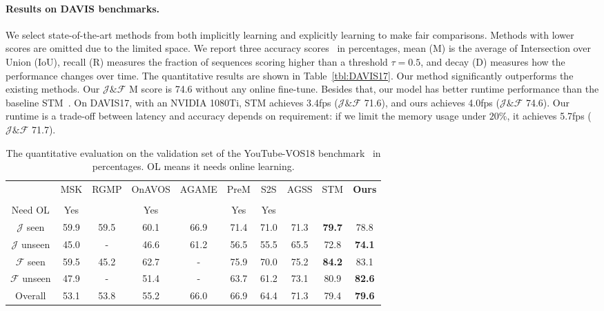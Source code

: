 \documentclass{article}
\begin{document}
\paragraph{Results on DAVIS benchmarks.}
We select state-of-the-art methods from both implicitly learning and explicitly learning to make fair comparisons.
Methods with lower scores are omitted due to the limited space.
We report three accuracy scores~\cite{pont-tuset_2017_2018} in percentages, mean (M) is the average of Intersection over Union (IoU), recall (R) measures the fraction of sequences scoring higher than a threshold $\tau=0.5$, and decay (D) measures how the performance changes over time.
The quantitative results are shown in Table~\ref{tbl:DAVIS17}.
Our method significantly outperforms the existing methods.
Our $\mathcal{J} \& \mathcal{F}$ M score is 74.6 without any online fine-tune.
Besides that, our model has better runtime performance than the baseline STM~\cite{oh_video_2019}.
On DAVIS17, with an NVIDIA 1080Ti, STM achieves 3.4fps ($\mathcal{J} \& \mathcal{F}$ 71.6), and ours achieves 4.0fps ($\mathcal{J} \& \mathcal{F}$ 74.6). 
Our runtime is a trade-off between latency and accuracy depends on requirement: if we limit the memory usage under $20\%$, it achieves 5.7fps ($\mathcal{J} \& \mathcal{F}$ 71.7).


\begin{table}
   \caption{The quantitative evaluation on the validation set of the YouTube-VOS18 benchmark~\cite{xu_youtube-vos_2018} in percentages. OL means it needs online learning.}
  \label{tbl:YV}
  \centering
  \begin{tabular}{c|ccccccccc}
        \toprule
         & MSK & RGMP & OnAVOS & AGAME & PreM & S2S & AGSS & STM & \textbf{Ours}\\
         & \cite{Perazzi2017} & \cite{oh_fast_2018} & \cite{voigtlaender17BMVC} & \cite{johnander2019generative} & \cite{luiten_premvos_2018} & \cite{xu2018youtube} & \cite{lin_agss-vos_2019} & \cite{oh_video_2019} & \\
         \midrule
         Need OL & Yes & & Yes &  & Yes & Yes & & &\\
         \midrule
        $\mathcal{J}$ seen   & 59.9 & 59.5 & 60.1 & 66.9 & 71.4 & 71.0 & 71.3 & \textbf{79.7} & 78.8 \\
        $\mathcal{J}$ unseen & 45.0 & -    & 46.6 & 61.2 & 56.5 & 55.5 & 65.5 & 72.8 & \textbf{74.1}\\
        \midrule
        $\mathcal{F}$ seen   & 59.5 & 45.2 & 62.7 & -    & 75.9 & 70.0 & 75.2 & \textbf{84.2} & 83.1\\
        $\mathcal{F}$ unseen & 47.9 & -    & 51.4 & -    & 63.7 & 61.2 & 73.1 & 80.9 & \textbf{82.6}\\
        \midrule
        Overall              & 53.1 & 53.8 & 55.2 & 66.0 & 66.9 & 64.4 & 71.3 & 79.4  & \textbf{79.6}\\
        
        \bottomrule
    \end{tabular}

\end{table}
\end{document}
